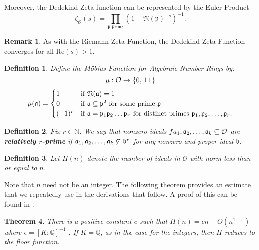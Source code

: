 \documentclass[12pt]{amsart}
\newtheorem{theorem}{Theorem}[subsection]
\newtheorem{definition}[theorem]{Definition}
\theoremstyle{definition}
\newtheorem*{remark}{Remark}
\newcommand{\f}[1]{\mathfrak{#1}}
\begin{document}
Moreover, the Dedekind Zeta function can be represented by the Euler Product
$$\zeta_{\mathcal{O}}(s)=\prod_{\f{p \text{ prime}}}(1-\f{N(p)}^{-s})^{-1}.$$

\begin{remark}
	As with the Riemann Zeta Function, the Dedekind Zeta Function converges for all \(\text{Re} (s)>1\).
\end{remark}

\begin{definition} Define the M\"obius Function for Algebraic Number Rings by: 
	\begin{equation*}
		\mu:\mathcal{O}\to \{0,\pm 1\} \notag
	\end{equation*}
	\begin{equation*}
		\mu(\f{a})=\begin{cases}
			1 & \text{if \(\f{\mathfrak{N}(a)}=1\)}\\
			0 & \text{if \(\f{a\subseteq \f{p}}^2\) for some prime \(\f{p}\) }\\
			(-1)^r & \text{if \(\f{a}=\f{p}_1 \f{p}_2\mathellipsis\f{p}_r\) for distinct primes \( \f{p}_1,\f{p}_2,\mathellipsis, \f{p}_r\)}.
		\end{cases}
	\end{equation*}
\end{definition}

\begin{definition} Fix $r \in \mathbb{N}$. We say that nonzero ideals \(f{a}_1,\f{a}_2,\mathellipsis,\f{a}_k \subseteq \mathcal{O}\)  are \textbf{relatively \(r\)-prime} if \(\f{a}_1,\f{a}_2,\mathellipsis,\f{a}_k\not\subseteq \f{b}^r\) for any nonzero and proper ideal \(\f{b}\).
\end{definition}

\begin{definition} \label{H}
	Let $H(n)$ denote the number of ideals in $\mathcal{O}$ with norm less than or equal to $n$.
\end{definition}

Note that $n$ need not be an integer. The following theorem provides an estimate that we repeatedly use in the derivations that follow. A proof of this can be found in \cite{Marcus}.

\begin{theorem} There is a positive constant \(c\) such that \(H(n)=cn+O(n^{1-\epsilon})\) where \(\epsilon = [K : \mathbb{Q}]^{-1}\) \label{H-estimate}. If \(K=\mathbb{Q}\), as in the case for the integers, then \(H\) reduces to the floor function.
\end{theorem}
\end{document}
